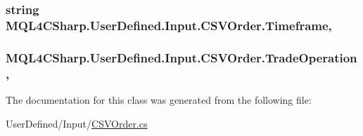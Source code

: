 \subsubsection[{\texorpdfstring{Timeframe}{Timeframe}}]{\setlength{\rightskip}{0pt plus 5cm}string M\+Q\+L4\+C\+Sharp.\+User\+Defined.\+Input.\+C\+S\+V\+Order.\+Timeframe\hspace{0.3cm}{\ttfamily [get]}, {\ttfamily [set]}}\hypertarget{class_m_q_l4_c_sharp_1_1_user_defined_1_1_input_1_1_c_s_v_order_a610cbb8b988902129534c86428dc749c}{}\label{class_m_q_l4_c_sharp_1_1_user_defined_1_1_input_1_1_c_s_v_order_a610cbb8b988902129534c86428dc749c}
\subsubsection[{\texorpdfstring{Trade\+Operation}{TradeOperation}}]{ M\+Q\+L4\+C\+Sharp.\+User\+Defined.\+Input.\+C\+S\+V\+Order.\+Trade\+Operation\hspace{0.3cm}{\ttfamily [get]}, {\ttfamily [set]}}\hypertarget{class_m_q_l4_c_sharp_1_1_user_defined_1_1_input_1_1_c_s_v_order_a1b429c1a7fd22cd06804e52df85c3e7f}{}\label{class_m_q_l4_c_sharp_1_1_user_defined_1_1_input_1_1_c_s_v_order_a1b429c1a7fd22cd06804e52df85c3e7f}


The documentation for this class was generated from the following file\+:\begin{DoxyCompactItemize}
\item 
User\+Defined/\+Input/\hyperlink{_c_s_v_order_8cs}{C\+S\+V\+Order.\+cs}\end{DoxyCompactItemize}
